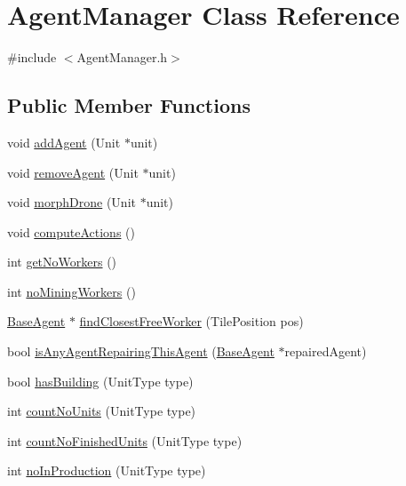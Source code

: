 \hypertarget{class_agent_manager}{\section{Agent\-Manager Class Reference}
\label{class_agent_manager}
}


{\ttfamily \#include $<$Agent\-Manager.\-h$>$}

\subsection*{Public Member Functions}
\begin{DoxyCompactItemize}
\item 
void \hyperlink{class_agent_manager_a9dd0d16d66f2cfada2f20397b33bc5cd}{add\-Agent} (Unit $\ast$unit)
\item 
void \hyperlink{class_agent_manager_ad1da6ed354a16c0b6f482732a24a09df}{remove\-Agent} (Unit $\ast$unit)
\item 
void \hyperlink{class_agent_manager_a4b1480ecb76df3ede61e5b39dfbf7032}{morph\-Drone} (Unit $\ast$unit)
\item 
void \hyperlink{class_agent_manager_a7eedeb3178b8d9a5b091867646d9e536}{compute\-Actions} ()
\item 
int \hyperlink{class_agent_manager_ac4ae750f805a987300fe65bdb4f336b1}{get\-No\-Workers} ()
\item 
int \hyperlink{class_agent_manager_a2dfe87ce8581ba48eb0b1da67cd122d0}{no\-Mining\-Workers} ()
\item 
\hyperlink{class_base_agent}{Base\-Agent} $\ast$ \hyperlink{class_agent_manager_a06155f45244270a4a70102b98b983b75}{find\-Closest\-Free\-Worker} (Tile\-Position pos)
\item 
bool \hyperlink{class_agent_manager_afb5e43191c541cdc7324b7a0bc02c932}{is\-Any\-Agent\-Repairing\-This\-Agent} (\hyperlink{class_base_agent}{Base\-Agent} $\ast$repaired\-Agent)
\item 
bool \hyperlink{class_agent_manager_ac7f2ac03687eed854d1f3fb4ca0e2775}{has\-Building} (Unit\-Type type)
\item 
int \hyperlink{class_agent_manager_a3f4d24334600f80648ec24a94caa006c}{count\-No\-Units} (Unit\-Type type)
\item 
int \hyperlink{class_agent_manager_ae582c2031f0bd10831a698daec68b05d}{count\-No\-Finished\-Units} (Unit\-Type type)
\item 
int \hyperlink{class_agent_manager_a8493841682201fb2fa07f25b57fa3086}{no\-In\-Production} (Unit\-Type type)

\end{DoxyCompactItemize}
